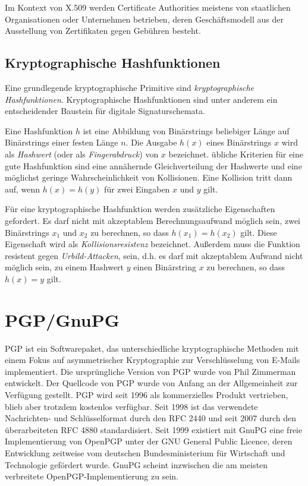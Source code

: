 Im Kontext von X.509 werden Certificate Authorities meistens von
staatlichen Organisationen oder Unternehmen betrieben, deren
Geschäftsmodell aus der Ausstellung von Zertifikaten gegen
Gebühren besteht. 

\subsection{Kryptographische Hashfunktionen}
\label{sec:krypt-hashf}

Eine grundlegende kryptographische Primitive sind
\emph{kryptographische Hashfunktionen}. Kryptographische
Hashfunktionen sind unter anderem ein entscheidender Baustein für
digitale Signaturschemata.

Eine Hashfunktion $h$ ist eine Abbildung von Binärstrings beliebiger
Länge auf Binärstrings einer festen Länge $n$. Die Ausgabe
$h(x)$ eines Binärstrings $x$ wird als \emph{Hashwert} (oder als
\emph{Fingerabdruck}) von $x$ bezeichnet. übliche Kriterien für
eine gute Hashfunktion sind eine annähernde Gleichverteilung der
Hashwerte und eine möglichst geringe Wahrscheinlichkeit von
Kollisionen. Eine Kollision tritt dann auf, wenn $h(x) = h(y)$ für
zwei Eingaben $x$ und $y$ gilt.

Für eine kryptographische Hashfunktion werden zusätzliche
Eigenschaften gefordert. Es darf nicht mit akzeptablem
Berechnungsaufwand möglich sein, zwei Binärstrings $x_1$ und $x_2$
zu berechnen, so dass $h(x_1) = h(x_2)$ gilt. Diese Eigenschaft wird
als \emph{Kollisionsresistenz} bezeichnet. Außerdem muss die Funktion
resistent gegen \emph{Urbild-Attacken}, sein, d.h. es darf mit
akzeptablem Aufwand nicht möglich sein, zu einem Hashwert $y$ einen
Binärstring $x$ zu berechnen, so dass $h(x) = y$ gilt.


\section{PGP/GnuPG}
\label{ch:Grundlagen:sec:PGP}

PGP ist ein Softwarepaket, das unterschiedliche kryptographische
Methoden mit einem Fokus auf asymmetrischer Kryptographie zur
Verschlüsselung von E-Mails implementiert.  Die ursprüngliche
Version von PGP wurde von Phil Zimmerman entwickelt. Der Quellcode von
PGP wurde von Anfang an der Allgemeinheit zur Verfügung
gestellt. PGP wird seit 1996 als kommerzielles Produkt vertrieben,
blieb aber trotzdem kostenlos verfügbar\cite{wiki:pgp}. Seit 1998
ist das verwendete Nachrichten- und Schlüsselformat durch den RFC
2440\cite{Callas1998} und seit 2007 durch den überarbeiteten RFC
4880\cite{Callas2007} standardisiert. Seit 1999 existiert mit
GnuPG\cite{Gnupg2010} eine freie Implementierung von OpenPGP unter der
GNU General Public Licence, deren Entwicklung zeitweise vom deutschen
Bundesministerium für Wirtschaft und Technologie gefördert
wurde. GnuPG scheint inzwischen die am meisten verbreitete
OpenPGP-Implementierung zu sein.

